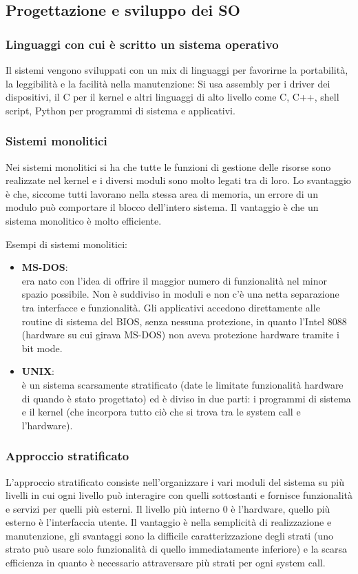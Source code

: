 \documentclass[a4paper]{article}
\begin{document}
\subsection{Progettazione e sviluppo dei SO}
\subsubsection*{Linguaggi con cui è scritto un sistema operativo}
Il sistemi vengono sviluppati con un mix di linguaggi per favorirne la portabilità, la leggibilità e la facilità nella manutenzione:
Si usa assembly per i driver dei dispositivi, il C per il kernel e altri linguaggi di alto livello come C, C++, shell script, Python
per programmi di sistema e applicativi.

\subsubsection*{Sistemi monolitici}
Nei sistemi monolitici si ha che tutte le funzioni di gestione delle risorse sono realizzate nel kernel e i diversi moduli
sono molto legati tra di loro. Lo svantaggio è che, siccome tutti lavorano nella stessa area di memoria, un errore di un
modulo può comportare il blocco dell'intero sistema. Il vantaggio è che un sistema monolitico è molto efficiente.

\noindent
Esempi di sistemi monolitici:
\begin{itemize}
	\item \textbf{MS-DOS}: \\
	era nato con l'idea di offrire il maggior numero di funzionalità nel minor spazio possibile. Non è suddiviso in moduli e non
	c'è una netta separazione tra interfacce e funzionalità. Gli applicativi accedono direttamente alle routine di sistema del
	BIOS, senza nessuna protezione, in quanto l'Intel 8088 (hardware su cui girava MS-DOS) non aveva protezione hardware tramite
	i bit mode.
	\item \textbf{UNIX}: \\
	è un sistema scarsamente stratificato (date le limitate funzionalità hardware di quando è stato progettato) ed è diviso in
	due parti: i programmi di sistema e il kernel (che incorpora tutto ciò che si trova tra le system call e l'hardware).
\end{itemize}

\subsubsection*{Approccio stratificato}
L'approccio stratificato consiste nell'organizzare i vari moduli del sistema su più livelli in cui ogni livello può interagire
con quelli sottostanti e fornisce funzionalità e servizi per quelli più esterni. Il livello più interno 0 è l'hardware, quello
più esterno è l'interfaccia utente. Il vantaggio è nella semplicità di realizzazione e manutenzione, gli svantaggi sono la
difficile caratterizzazione degli strati (uno strato può usare solo funzionalità di quello immediatamente inferiore) e la scarsa
efficienza in quanto è necessario attraversare più strati per ogni system call.
\end{document}

